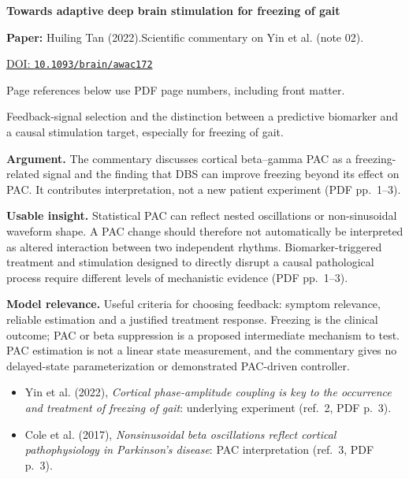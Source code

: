 

{\Large\bfseries Towards adaptive deep brain stimulation for freezing of gait\par}

\textbf{Paper:} Huiling Tan (2022).\quad Scientific commentary on Yin et al. (note 02).\par
\href{https://doi.org/10.1093/brain/awac172}{DOI: \nolinkurl{10.1093/brain/awac172}}\par
{\footnotesize Page references below use PDF page numbers, including front matter.}

Feedback-signal selection and the distinction between a predictive biomarker and a causal stimulation target, especially for freezing of gait.

\textbf{Argument.} The commentary discusses cortical beta--gamma PAC as a freezing-related signal and the finding that DBS can improve freezing beyond its effect on PAC. It contributes interpretation, not a new patient experiment (PDF pp.~1--3).

\textbf{Usable insight.} Statistical PAC can reflect nested oscillations or non-sinusoidal waveform shape. A PAC change should therefore not automatically be interpreted as altered interaction between two independent rhythms. Biomarker-triggered treatment and stimulation designed to directly disrupt a causal pathological process require different levels of mechanistic evidence (PDF pp.~1--3).

\textbf{Model relevance.} Useful criteria for choosing feedback: symptom relevance, reliable estimation and a justified treatment response. Freezing is the clinical outcome; PAC or beta suppression is a proposed intermediate mechanism to test. PAC estimation is not a linear state measurement, and the commentary gives no delayed-state parameterization or demonstrated PAC-driven controller.

\begin{itemize}
\item Yin et al. (2022), \emph{Cortical phase-amplitude coupling is key to the occurrence and treatment of freezing of gait}: underlying experiment (ref.~2, PDF p.~3).
\item Cole et al. (2017), \emph{Nonsinusoidal beta oscillations reflect cortical pathophysiology in Parkinson's disease}: PAC interpretation (ref.~3, PDF p.~3).
\end{itemize}


